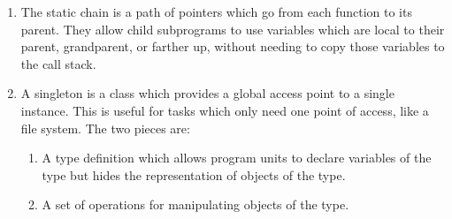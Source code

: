 \begin{enumerate}
\item The static chain is a path of pointers which go from each
  function to its parent. They allow child subprograms to use
  variables which are local to their parent, grandparent, or farther
  up, without needing to copy those variables to the call stack.
\item A singleton is a class which provides a global access point to a
  single instance. This is useful for tasks which only need one point
  of access, like a file system.
The two pieces are:
\begin{enumerate}
\item A type definition which allows program units to declare
  variables of the type but hides the representation of objects of the
  type.
\item A set of operations for manipulating objects of the type.
\end{enumerate}

  \end{enumerate}

